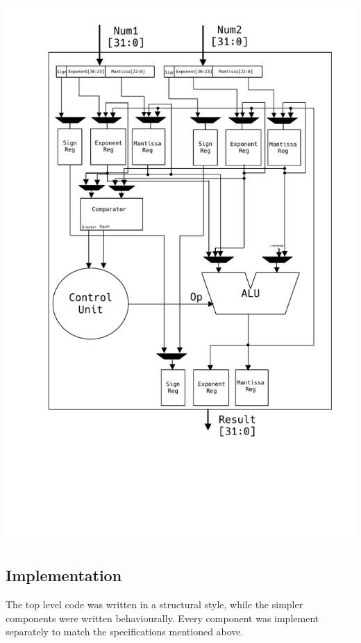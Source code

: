 \documentclass[a4paper,10pt]{article}
\begin{document}
    \centerline{\includegraphics[scale=0.75, trim= 0cm 12cm 0cm 0cm]{adder.pdf}}

    \newpage
    \subsection{Implementation}
    The top level code was written in a structural style, while the simpler components were written behaviourally. Every component was implement separately to match the specifications mentioned above.\\
\end{document}
